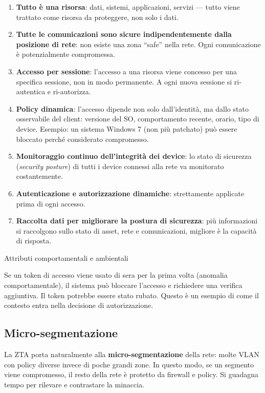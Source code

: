\documentclass[
  italian,
  openany]{book}
\begin{document}
\begin{enumerate}
\def\labelenumi{\arabic{enumi}.}
\item
  \textbf{Tutto è una risorsa}: dati, sistemi, applicazioni, servizi ---
  tutto viene trattato come risorsa da proteggere, non solo i dati.
\item
  \textbf{Tutte le comunicazioni sono sicure indipendentemente dalla
  posizione di rete}: non esiste una zona ``safe'' nella rete. Ogni
  comunicazione è potenzialmente compromessa.
\item
  \textbf{Accesso per sessione}: l'accesso a una risorsa viene concesso
  per una specifica sessione, non in modo permanente. A ogni nuova
  sessione si ri-autentica e ri-autorizza.
\item
  \textbf{Policy dinamica}: l'accesso dipende non solo dall'identità, ma
  dallo stato osservabile del client: versione del SO, comportamento
  recente, orario, tipo di device. Esempio: un sistema Windows 7 (non
  più patchato) può essere bloccato perché considerato compromesso.
\item
  \textbf{Monitoraggio continuo dell'integrità dei device}: lo stato di
  sicurezza (\emph{security posture}) di tutti i device connessi alla
  rete va monitorato costantemente.
\item
  \textbf{Autenticazione e autorizzazione dinamiche}: strettamente
  applicate prima di ogni accesso.
\item
  \textbf{Raccolta dati per migliorare la postura di sicurezza}: più
  informazioni si raccolgono sullo stato di asset, rete e comunicazioni,
  migliore è la capacità di risposta.
\end{enumerate}

\begin{callouttip}{Attributi comportamentali e ambientali}

Se un token di accesso viene usato di sera per la prima volta (anomalia
comportamentale), il sistema può bloccare l'accesso e richiedere una
verifica aggiuntiva. Il token potrebbe essere stato rubato. Questo è un
esempio di come il contesto entra nella decisione di autorizzazione.

\end{callouttip}

\subsection{Micro-segmentazione}\label{micro-segmentazione}

La ZTA porta naturalmente alla \textbf{micro-segmentazione} della rete:
molte VLAN con policy diverse invece di poche grandi zone. In questo
modo, se un segmento viene compromesso, il resto della rete è protetto
da firewall e policy. Si guadagna tempo per rilevare e contrastare la
minaccia.
\end{document}
